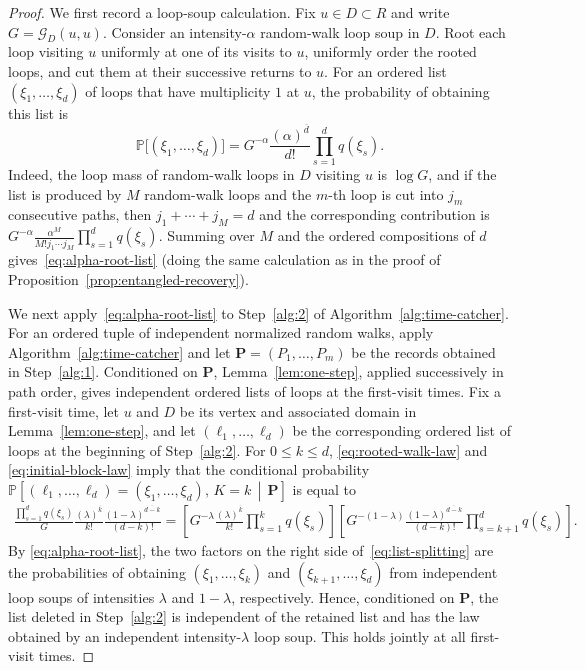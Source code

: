 \documentclass[10pt,a4paper]{amsart}
\newcommand{\Gc}{\mathcal G}
\newcommand{\Prob}{\mathbb P}
\begin{document}
\begin{proof}
We first record a loop-soup calculation.  Fix $u\in D\subset R$ and write $G=\Gc_D(u,u)$.
Consider an intensity-$\alpha$ random-walk loop soup in $D$.  Root each
loop visiting $u$ uniformly at one of its visits to $u$, uniformly order
the rooted loops, and cut them at their successive returns to $u$.  For
an ordered list $(\xi_1,\ldots,\xi_d)$ of loops that have multiplicity $1$ at $u$, the probability of obtaining this list is
\begin{equation}\label{eq:alpha-root-list}
 \Prob\bigl[(\xi_1,\ldots,\xi_d)\bigr]
 =
 G^{-\alpha}\frac{(\alpha)^{\overline d}}{d!}
 \prod_{s=1}^d q(\xi_s).
\end{equation}
Indeed, the loop mass of random-walk loops in $D$ visiting $u$ is $\log G$, and if
the list is produced by $M$ random-walk loops and the $m$-th loop is cut into
$j_m$ consecutive paths, then $j_1+\cdots+j_M=d$
and the corresponding contribution is $ G^{-\alpha}
 \frac{\alpha^M}{M!j_1\cdots j_M}
 \prod_{s=1}^d q(\xi_s)$.
Summing over $M$ and the ordered compositions of $d$ gives~\eqref{eq:alpha-root-list} (doing the same calculation as in the proof of Proposition~\ref{prop:entangled-recovery}).

We next apply~\eqref{eq:alpha-root-list} to Step~\ref{alg:2} of
Algorithm~\ref{alg:time-catcher}.  For an ordered tuple of independent normalized random walks, apply Algorithm~\ref{alg:time-catcher} and let $\boldsymbol P=(P_1,\ldots,P_m)$
be the records obtained in Step~\ref{alg:1}.  Conditioned on
$\boldsymbol P$, Lemma~\ref{lem:one-step}, applied successively in path
order, gives independent ordered lists of loops at the first-visit times.
Fix a first-visit time, let $u$ and $D$ be its vertex and associated domain
in Lemma~\ref{lem:one-step}, and let $(\ell_1,\ldots,\ell_d)$
be the corresponding ordered list of loops at the beginning of Step~\ref{alg:2}.  For
$0\le k\le d$, \eqref{eq:rooted-walk-law} and
\eqref{eq:initial-block-law} imply that the conditional probability $\Prob\!\left[
   (\ell_1,\ldots,\ell_d)=(\xi_1,\ldots,\xi_d),\,K=k
   \,\middle|\,\boldsymbol P
 \right]$ is equal to
\begin{align}\label{eq:list-splitting}
 \frac{\prod_{s=1}^d q(\xi_s)}{G}
 \frac{(\lambda)^{\overline k}}{k!}
 \frac{(1-\lambda)^{\overline{d-k}}}{(d-k)!}=
 \left[
  G^{-\lambda}
  \frac{(\lambda)^{\overline k}}{k!}
  \prod_{s=1}^k q(\xi_s)
 \right]
 \left[
  G^{-(1-\lambda)}
  \frac{(1-\lambda)^{\overline{d-k}}}{(d-k)!}
  \prod_{s=k+1}^d q(\xi_s)
 \right].
\end{align}
By \eqref{eq:alpha-root-list}, the two factors on the right side of~\eqref{eq:list-splitting} are the probabilities of obtaining $(\xi_1,\ldots,\xi_k)$ and $(\xi_{k+1},\ldots,\xi_d)$
from independent loop soups of intensities $\lambda$ and $1-\lambda$,
respectively.  Hence, conditioned on $\boldsymbol P$, the list deleted in
Step~\ref{alg:2} is independent of the retained list and has the law
obtained by an independent intensity-$\lambda$ loop soup.  This holds
jointly at all first-visit times.


\end{proof}
\end{document}
